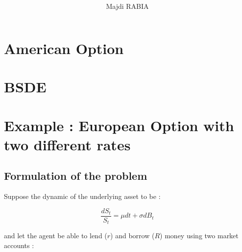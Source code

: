 \documentclass[english,a4paper,12pt,titlepage]{book}
\begin{document}
	
	\begin{titlepage}
		
		\title{
			\hspace{0.65cm}
			\newline
			\newline 
			\hspace{0.3cm}\textbf{}
		}
		
		\author{Majdi RABIA}
		\date{
			\hspace{2.2cm}
			\newline
			\newline
			\hspace*{-1cm}
		}
		
		\maketitle
		
	\end{titlepage}
	

\thispagestyle{empty}

\newpage

\tableofcontents
\thispagestyle{empty}

\newpage

\chapter{American Option}


\chapter{BSDE}


\chapter{Example : European Option with two different rates}

\section{Formulation of the problem}

Suppose the dynamic of the underlying asset to be : 

\begin{equation}
\frac{dS_t}{S_t}=\mu dt + \sigma dB_t
\end{equation}

and let the agent be able to lend ($r$) and borrow ($R$) money using two market accounts : 
\end{document}
